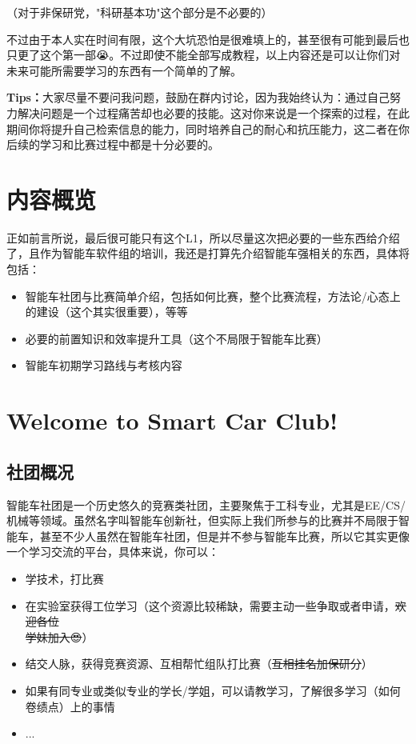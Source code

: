 \documentclass[a4paper,12pt]{article}
\newcommand{\emoji}[1]{{\EmojiFont #1}}
\begin{document}
（对于非保研党，"科研基本功"这个部分是不必要的）

不过由于本人实在时间有限，这个大坑恐怕是很难填上的，甚至很有可能到最后也只更了这个第一部\emoji{😭}。不过即使不能全部写成教程，以上内容还是可以让你们对未来可能所需要学习的东西有一个简单的了解。

\begin{tipbox}
\textbf{Tips：}大家尽量不要问我问题，鼓励在群内讨论，因为我始终认为：通过自己努力解决问题是一个过程痛苦却也必要的技能。这对你来说是一个探索的过程，在此期间你将提升自己检索信息的能力，同时培养自己的耐心和抗压能力，这二者在你后续的学习和比赛过程中都是十分必要的。
\end{tipbox}

\section{内容概览}

正如前言所说，最后很可能只有这个L1，所以尽量这次把必要的一些东西给介绍了，且作为智能车软件组的培训，我还是打算先介绍智能车强相关的东西，具体将包括：

\begin{itemize}
    \item 智能车社团与比赛简单介绍，包括如何比赛，整个比赛流程，方法论/心态上的建设（这个其实很重要），等等
    \item 必要的前置知识和效率提升工具（这个不局限于智能车比赛）
    \item 智能车初期学习路线与考核内容
\end{itemize}

\section{Welcome to Smart Car Club!}

\subsection{社团概况}

智能车社团是一个历史悠久的竞赛类社团，主要聚焦于工科专业，尤其是EE/CS/机械等领域。虽然名字叫智能车创新社，但实际上我们所参与的比赛并不局限于智能车，甚至不少人虽然在智能车社团，但是并不参与智能车比赛，所以它其实更像一个学习交流的平台，具体来说，你可以：

\begin{itemize}
    \item 学技术，打比赛
    \item 在实验室获得工位学习（这个资源比较稀缺，需要主动一些争取或者申请，\sout{欢迎各位\\学妹加入\emoji{😍}}）
    \item 结交人脉，获得竞赛资源、互相帮忙组队打比赛（\sout{互相挂名加保研分}）
    \item 如果有同专业或类似专业的学长/学姐，可以请教学习，了解很多学习（如何卷绩点）上的事情
    \item ...
\end{itemize}
\end{document}
